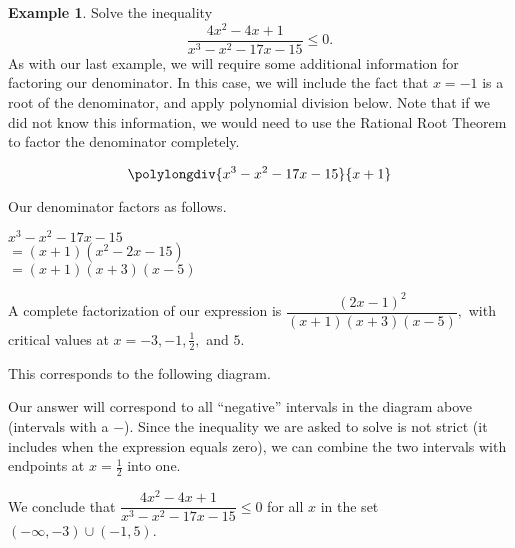\documentclass[12pt]{book}
\theoremstyle{definition}
\newtheorem{example}{Example}
\begin{document}
\begin{example} Solve the inequality $$\dfrac{4x^2-4x+1}{x^3-x^2-17x-15}\leq 0.$$
As with our last example, we will require some additional information for factoring our denominator.  In this case, we will include the fact that $x=-1$ is a root of the denominator, and apply polynomial division below.  Note that if we did not know this information, we would need to use the Rational Root Theorem to factor the denominator completely.
\begin{multicols}{2}
\[
\polylongdiv{x^3-x^2-17x-15}{x+1}
\]

\columnbreak

Our denominator factors as follows.
\begin{center}
$x^3-x^2-17x-15$\\
$=(x+1)(x^2-2x-15)$\\
$=(x+1)(x+3)(x-5)$
\end{center}
\end{multicols}
A complete factorization of our expression is $\dfrac{(2x-1)^2}{(x+1)(x+3)(x-5)},$ with critical values at $x=-3,-1,\frac{1}{2},$ and $5$.
\par
This corresponds to the following diagram.
\begin{center}
\end{center}
Our answer will correspond to all ``negative'' intervals in the diagram above (intervals with a $-$).  Since the inequality we are asked to solve is not strict (it includes when the expression equals zero), we can combine the two intervals with endpoints at $x=\frac{1}{2}$ into one.
\begin{center}
We conclude that $\dfrac{4x^2-4x+1}{x^3-x^2-17x-15}\leq 0$ for all $x$ in the set $(-\infty,-3)\cup(-1,5)$.
\end{center}
\end{example}
\end{document}
